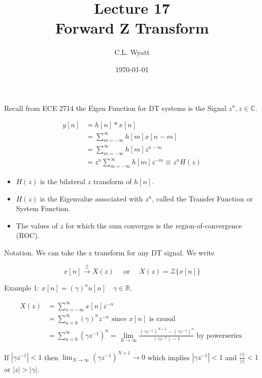 \documentclass{article}
\begin{document}
\title{Lecture 17\\Forward Z Transform}
\author{C.L. Wyatt}
\date{\today}
\maketitle


Recall from ECE 2714 the Eigen Function for DT systems is the Signal $z^{n}, z \in \mathbb{C}$.

$$
\begin{aligned}
y[n] &= h[n] * x[n]\\
& =\sum_{m=-\infty}^{\infty} h[m] x[n-m] \\
& =\sum_{m=-\infty}^{\infty} h[m] z^{n-m} \\
& =z^{n} \sum_{m=-\infty}^{\infty} h[m] z^{-m} \equiv z^{n} H(z)
\end{aligned}
$$

\begin{itemize}
  \item $H(z)$ is the bilateral $z$ transform of $h[n]$.
  \item $H(z)$ is the Eigenvalue associated with $z^{n}$, called the Transfer Function or System Function.
  \item The values of $z$ for which the sum converges is the region-of-convergence (ROC). 
\end{itemize}


Notation. We can take the z transform for any DT signal. We write

$$
x[n] \stackrel{\mathcal{Z}}{\longrightarrow} X(z) \quad\text{ or }\quad  X(z)=\mathcal{Z}\{x[n]\}
$$

Example 1: $x[n]=(\gamma)^{n} u[n] \quad \gamma \in \mathbb{R}$.


$$
\begin{aligned}
X(z) & =\sum_{n=-\infty}^{\infty} x[n] z^{-n} \\
& =\sum_{n=0}^{\infty}(\gamma)^{n} z^{-n} \text { since } x[n] \text { is causal} \\
& =\sum_{n=0}^{\infty}\left(\gamma z^{-1}\right)^{n}=\lim _{N \rightarrow \infty} \frac{\left(\gamma z^{-1}\right)^{N+1}-\left(\gamma z^{-1}\right)^{0}}{\left(\gamma z^{-1}\right)-1} \text { by powerseries } \end{aligned}
$$

If $\left|\gamma z^{-1}\right|<1$ then $\lim_{N \rightarrow \infty}\left(\gamma z^{-1}\right)^{N+1} \rightarrow 0$ which implies $\left|\gamma z^{-1}\right|<1$ and $\frac{|\gamma|}{|z|}<1$ or $|z|>|\gamma|$.
\end{document}
